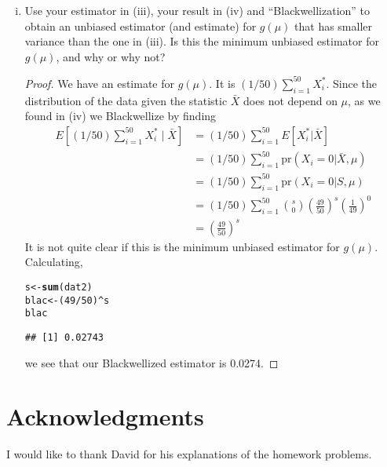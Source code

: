 \documentclass[letterpaper, 12pt]{article}\usepackage{graphicx, color}
\makeatletter
\newcommand{\hlfunctioncall}[1]{\textcolor[rgb]{0.501960784313725,0,0.329411764705882}{\textbf{#1}}}%
\newenvironment{kframe}{%
 \def\at@end@of@kframe{}%
 \ifinner\ifhmode%
  \def\at@end@of@kframe{\end{minipage}}%
  \begin{minipage}{\columnwidth}%
 \fi\fi%
 \def\FrameCommand##1{\hskip\@totalleftmargin \hskip-\fboxsep
 \colorbox{shadecolor}{##1}\hskip-\fboxsep
     \hskip-\linewidth \hskip-\@totalleftmargin \hskip\columnwidth}%
 \MakeFramed {\advance\hsize-\width
   \@totalleftmargin\z@ \linewidth\hsize
   \@setminipage}}%
 {\par\unskip\endMakeFramed%
 \at@end@of@kframe}
\newenvironment{knitrout}{}{} %
\newcommand{\pr}{\text{pr}}
\newcommand{\sbs}{\;|\;} %
\makeatother
\begin{document}
\begin{enumerate}
\begin{enumerate}[(i)]
\item
Use your estimator in (iii), your result in (iv) and ``Blackwellization'' to obtain an unbiased estimator (and estimate) for $g(\mu)$ that has smaller variance than the one in (iii). Is this the minimum unbiased estimator for $g(\mu)$, and why or why not? 

\begin{proof}
We have an estimate for $g(\mu)$. It is $(1/50)\sum_{i=1}^{50} X_i^*$. Since the distribution of the data given the statistic $\bar{X}$ does not depend on $\mu$, as we found in (iv) we Blackwellize by finding
\begin{align}
E\left[(1/50)\sum_{i=1}^{50} X_i^* \sbs \bar{X} \right] 
&= (1/50) \sum_{i=1}^{50} E[X_i^* | \bar{X}] \\
&= (1/50) \sum_{i=1}^{50} \pr(X_i = 0 | \bar{X}, \mu) \\
&= (1/50) \sum_{i=1}^{50} \pr(X_i = 0 | S, \mu) \\
&= (1/50) \sum_{i=1}^{50} 
\binom{s}{0} 
\left(\frac{49}{50}\right)^s 
\left( \frac{1}{49} \right)^{0}\\
&= \left(\frac{49}{50}\right)^s
\end{align}
It is not quite clear if this is the minimum unbiased estimator for $g(\mu)$.
Calculating, 

\begin{knitrout}
\color{fgcolor}\begin{kframe}
\begin{alltt}
s <- \hlfunctioncall{sum}(dat2)
blac <- (49/50)^s
blac
\end{alltt}
\begin{verbatim}
## [1] 0.02743
\end{verbatim}
\end{kframe}
\end{knitrout}


we see that our Blackwellized estimator is 0.0274.

\end{proof}
\end{enumerate}

\end{enumerate}

\section*{Acknowledgments}
I would like to thank David for his explanations of the homework problems.
\end{document}
